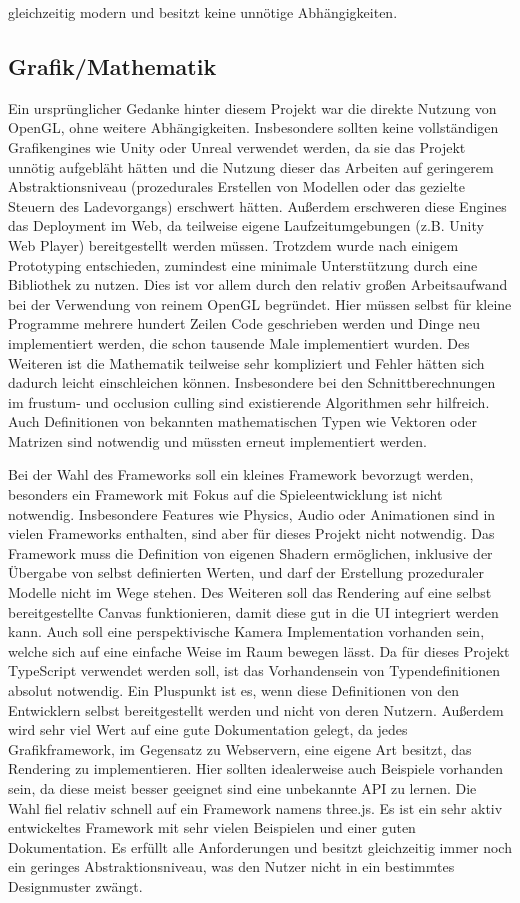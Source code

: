 gleichzeitig modern und besitzt keine unnötige Abhängigkeiten.

\subsection{Grafik/Mathematik}
Ein ursprünglicher Gedanke hinter diesem Projekt war die direkte Nutzung von OpenGL, ohne weitere Abhängigkeiten. Insbesondere sollten keine vollständigen Grafikengines wie Unity oder Unreal verwendet werden, da sie das Projekt unnötig aufgebläht hätten und die Nutzung dieser das Arbeiten auf geringerem Abstraktionsniveau (prozedurales Erstellen von Modellen oder das gezielte Steuern des Ladevorgangs) erschwert hätten. Außerdem erschweren diese Engines das Deployment im Web, da teilweise eigene Laufzeitumgebungen (z.B. Unity Web Player) bereitgestellt werden müssen. Trotzdem wurde nach einigem Prototyping entschieden, zumindest eine minimale Unterstützung durch eine Bibliothek zu nutzen. Dies ist vor allem durch den relativ großen Arbeitsaufwand bei der Verwendung von reinem OpenGL begründet. Hier müssen selbst für kleine Programme mehrere hundert Zeilen Code geschrieben werden und Dinge neu implementiert werden, die schon tausende Male implementiert wurden. Des Weiteren ist die Mathematik teilweise sehr kompliziert und Fehler hätten sich dadurch leicht einschleichen können. Insbesondere bei den Schnittberechnungen im frustum- und occlusion culling sind existierende Algorithmen sehr hilfreich. Auch Definitionen von bekannten mathematischen Typen wie Vektoren oder Matrizen sind notwendig und müssten erneut implementiert werden.

Bei der Wahl des Frameworks soll ein kleines Framework bevorzugt werden, besonders ein Framework mit Fokus auf die Spieleentwicklung ist nicht notwendig. Insbesondere Features wie Physics, Audio oder Animationen sind in vielen Frameworks enthalten, sind aber für dieses Projekt nicht notwendig. Das Framework muss die Definition von eigenen Shadern ermöglichen, inklusive der Übergabe von selbst definierten Werten, und darf der Erstellung prozeduraler Modelle nicht im Wege stehen. Des Weiteren soll das Rendering auf eine selbst bereitgestellte Canvas funktionieren, damit diese gut in die UI integriert werden kann. Auch soll eine perspektivische Kamera Implementation vorhanden sein, welche sich auf eine einfache Weise im Raum bewegen lässt. Da für dieses Projekt TypeScript verwendet werden soll, ist das Vorhandensein von Typendefinitionen absolut notwendig. Ein Pluspunkt ist es, wenn diese Definitionen von den Entwicklern selbst bereitgestellt werden und nicht von deren Nutzern. Außerdem wird sehr viel Wert auf eine gute Dokumentation gelegt, da jedes Grafikframework, im Gegensatz zu Webservern, eine eigene Art besitzt, das Rendering zu implementieren. Hier sollten idealerweise auch Beispiele vorhanden sein, da diese meist besser geeignet sind eine unbekannte API zu lernen. Die Wahl fiel relativ schnell auf ein Framework namens three.js. Es ist ein sehr aktiv entwickeltes Framework mit sehr vielen Beispielen und einer guten Dokumentation. Es erfüllt alle Anforderungen und besitzt gleichzeitig immer noch ein geringes Abstraktionsniveau, was den Nutzer nicht in ein bestimmtes Designmuster zwängt.

